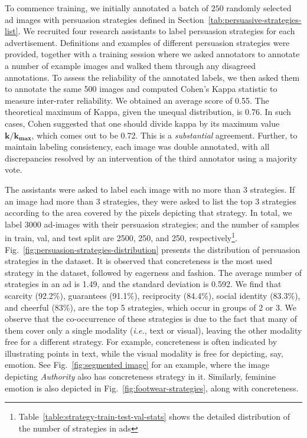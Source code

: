 To commence training, we initially annotated a batch of $250$ randomly selected ad images with persuasion strategies defined in Section~\ref{tab:persuasive-strategies-list}. We recruited four research assistants to label persuasion strategies for each advertisement. Definitions and examples of different persuasion strategies were provided, together with a training session where we asked annotators to annotate a number of example images and walked them through any disagreed annotations. To assess the reliability of the annotated labels, we then asked them to annotate the same 500 images and computed Cohen's Kappa statistic to measure inter-rater reliability. We obtained an average score of 0.55. The theoretical maximum of Kappa, given the unequal distribution, is 0.76. In such cases, Cohen \cite{cohen1960coefficient} suggested that one should divide kappa by its maximum value $\mathbf{k}/\mathbf{k_{max}}$, which comes out to be 0.72. This is a \textit{substantial} agreement. Further, to maintain labeling consistency, each image was double annotated, with all discrepancies resolved by an intervention of the third annotator using a majority vote. 


The assistants were asked to label each image with no more than 3 strategies. If an image had more than 3 strategies, they were asked to list the top 3 strategies according to the area covered by the pixels depicting that strategy. In total, we label 3000 ad-images with their persuasion strategies; and the number of samples in train, val, and test split are 2500, 250, and 250, respectively\footnote{Table~\ref{table:strategy-train-test-val-stats} shows the detailed distribution of the number of strategies in ads}. Fig.~\ref{fig:persuasion-strategies-distribution} presents the distribution of persuasion strategies in the dataset. It is observed that concreteness is the most used strategy in the dataset, followed by eagerness and fashion. The average number of strategies in an ad is 1.49, and the standard deviation is 0.592. We find that scarcity (92.2\%), guarantees (91.1\%), reciprocity (84.4\%), social identity (83.3\%), and cheerful (83\%), %
are the top 5 strategies, which occur in groups of 2 or 3. We observe that the co-occurrence of these strategies is due to the fact that many of them cover only a single modality (\textit{i.e.}, text or visual), leaving the other modality free for a different strategy. For example, concreteness is often indicated by illustrating points in text, while the visual modality is free for depicting, say, emotion. See Fig.~\ref{fig:segmented image} for an example, where the image depicting \textit{Authority} also has concreteness strategy in it. Similarly, feminine emotion is also depicted in Fig.~\ref{fig:footwear-strategies}, along with concreteness.


